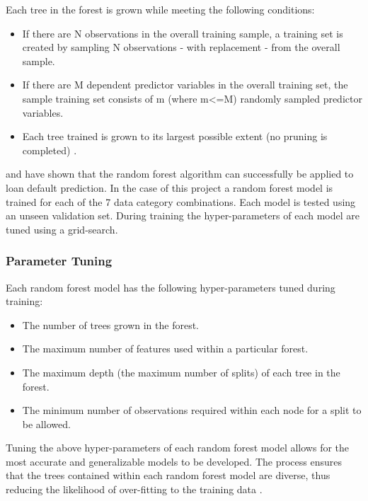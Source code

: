 Each tree in the forest is grown while meeting the following conditions:

\begin{itemize}
    \item If there are N observations in the overall training sample, a training set is created by sampling N observations - with replacement - from the overall sample. 
    \item If there are M dependent predictor variables in the overall training set, the sample training set consists of m (where m<=M) randomly sampled predictor variables. 
    \item Each tree trained is grown to its largest possible extent (no pruning is completed) \parencite{RandomForest}.
\end{itemize}

\textcite{BagWang} and \textcite{BigDataMicroFiance} have shown that the random forest algorithm can successfully be applied to loan default prediction. In the case of this project a random forest model is trained for each of the 7 data category combinations. Each model is tested using an unseen validation set. During training the hyper-parameters of each model are tuned using a grid-search. 

\subsubsection{Parameter Tuning}

Each random forest model has the following hyper-parameters tuned during training:

\begin{itemize}
    \item The number of trees grown in the forest.
    \item The maximum number of features used within a particular forest. 
    \item The maximum depth (the maximum number of splits) of each tree in the forest.
    \item The minimum number of observations required within each node for a split to be allowed. 
\end{itemize}

Tuning the above hyper-parameters of each random forest model allows for the most accurate and generalizable models to be developed. The process ensures that the trees contained within each random forest model are diverse, thus reducing the likelihood of over-fitting to the training data \parencite{RF_Tuning}. \\

